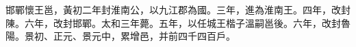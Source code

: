 \begin{pinyinscope}
 
 
 邯鄲懷王邕，黃初二年封淮南公，以九江郡為國。三年，進為淮南王。四年，改封陳。六年，改封邯鄲。太和三年薨。五年，以任城王楷子溫嗣邕後。六年，改封魯陽。景初、正元、景元中，累增邑，并前四千四百戶。
 
 
\end{pinyinscope}